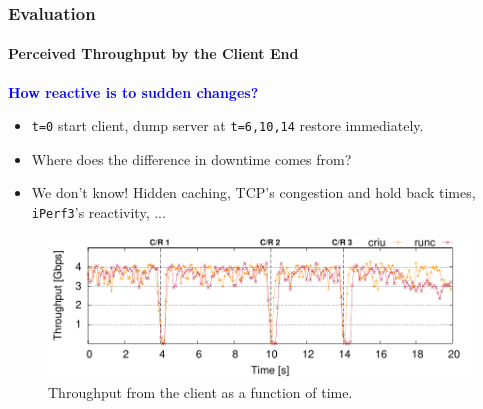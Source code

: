 \documentclass[9pt,    %
    english,            %
    xcolor=table,       %
    envcountsect,        %
    aspectratio=169     %
]{beamer}
\begin{document}
\begin{frame}
    \frametitle{Evaluation}
    \framesubtitle{Perceived Throughput by the Client End}

    \vspace{10pt}

    \textbf{\textcolor{blue}{How reactive is to sudden changes?}}
    \begin{itemize}
        \item \texttt{t=0} start client, dump server at \texttt{t=6,10,14} restore immediately.
        \item Where does the difference in downtime comes from?
        \item We don't know! Hidden caching, TCP's congestion and hold back times, \texttt{iPerf3}'s reactivity, ...
    \end{itemize}

    \vspace{-5pt}

    \begin{figure}
        \centering
        \includegraphics[width=.75\textwidth]{./images/tcp_established_resolution_microbenchmark.pdf}
        \caption{Throughput from the client as a function of time.\label{fig:evaluation-downtime}}
    \end{figure}
    
\end{frame}
\end{document}
